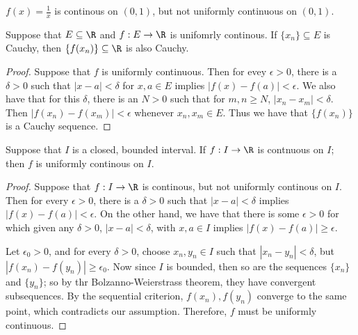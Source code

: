 \begin{example}
    $f(x)=\frac{1}{x}$ is continous on $(0,1)$, but not uniformly continuous on  $(0,1)$.		
\end{example} 

\begin{lemma}\label{3.4.1}
    Suppose that $E \subseteq \R$ and  $f:E \rightarrow \R$ is unifomrly continous. If  $\{x_n\} \subseteq E$ is 
    Cauchy, then  $\{f(x_n)\} \subseteq \R$ is also Cauchy.
\end{lemma}
\begin{proof}
    Suppose that $f$ is uniformly continuous. Then for evey  $\epsilon>0$, there is a 
    $\delta>0$ such that  $|x-a|<\delta$ for  $x,a \in E$ implies  $|f(x)-f(a)|<\epsilon$. We 
    also have that for this  $\delta$, there is an  $N>0$ such that for  $m,n \geq N$,  $|x_n-x_m|<\delta$.
    Then  $|f(x_n)-f(x_m)|<\epsilon$ whenever  $x_n,x_m \in E$. Thus we have that  $\{f(x_n)\}$ is 
    a Cauchy sequence.
\end{proof}

\begin{theorem}\label{3.4.1}
    Suppose that $I$ is a closed, bounded interval. If  $f:I \rightarrow \R$ is contnuous on  $I$; then 
     $f$ is uniformly continous on  $I$.
\end{theorem}
\begin{proof}
    Suppose that $f:I \rightarrow \R$ is continous, but not uniformly continous on  $I$. 
    Then for every $\epsilon>0$, there is a  $\delta>0$ such that  $|x-a|<\delta$ implies  $|f(x)-f(a)|<\epsilon$.
    On the other hand, we have that there is some  $\epsilon>0$ for which given any  $\delta>0$,  
    $|x-a|<\delta$, with $x,a \in I$ implies  $|f(x)-f(a)| \geq \epsilon$.

    Let $\epsilon_0>0$, and for every  $\delta>0$, choose  $x_n,y_n \in I$ such that $|x_n-y_n|<\delta$, but 
    $|f(x_n)-f(y_n)| \geq \epsilon_0$. Now since $I$ is bounded, then so are the sequences  $\{x_n\}$ and  $\{y_n\}$; 
    so by thr Bolzanno-Weierstrass theorem, they have convergent subsequences. By the sequential criterion, 
    $f(x_n), f(y_n)$ converge to the same point, which contradicts our assumption. Therefore, 
     $f$ must be uniformly continuous.
\end{proof}

